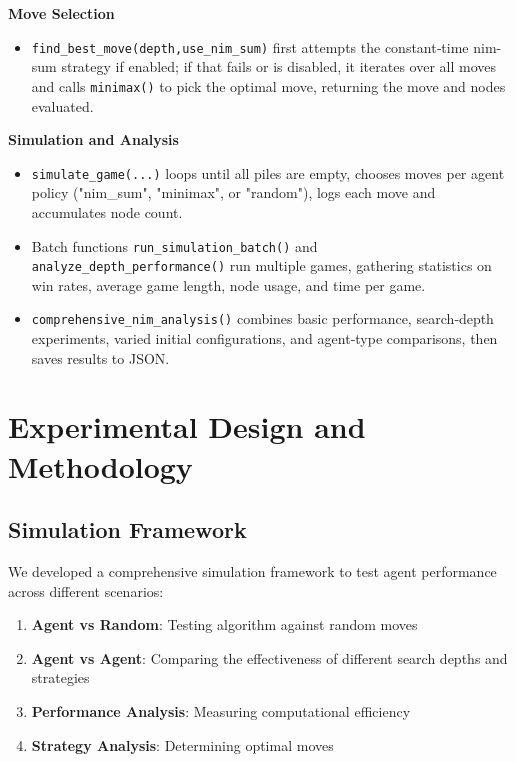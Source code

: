 \documentclass[12pt]{article}
\begin{document}
\noindent\textbf{Move Selection}
\begin{itemize}
  \item \texttt{find\_best\_move(depth,use\_nim\_sum)} first attempts the constant‑time nim-sum strategy if enabled; if that fails or is disabled, it iterates over all moves and calls \texttt{minimax()} to pick the optimal move, returning the move and nodes evaluated.
\end{itemize}

\noindent\textbf{Simulation and Analysis}
\begin{itemize}
  \item \texttt{simulate\_game(...)} loops until all piles are empty, chooses moves per agent policy ("nim_sum", "minimax", or "random"), logs each move and accumulates node count.
  \item Batch functions \texttt{run\_simulation\_batch()} and \texttt{analyze\_depth\_performance()} run multiple games, gathering statistics on win rates, average game length, node usage, and time per game.
  \item \texttt{comprehensive\_nim\_analysis()} combines basic performance, search‑depth experiments, varied initial configurations, and agent‑type comparisons, then saves results to JSON.
\end{itemize}

\section{Experimental Design and Methodology}

\subsection{Simulation Framework}

We developed a comprehensive simulation framework to test agent performance across different scenarios:

\begin{enumerate}
    \item \textbf{Agent vs Random}: Testing algorithm against random moves
\item \textbf{Agent vs Agent}: Comparing the effectiveness of different search depths and strategies
    \item \textbf{Performance Analysis}: Measuring computational efficiency
    \item \textbf{Strategy Analysis}: Determining optimal moves
\end{enumerate}
\end{document}
